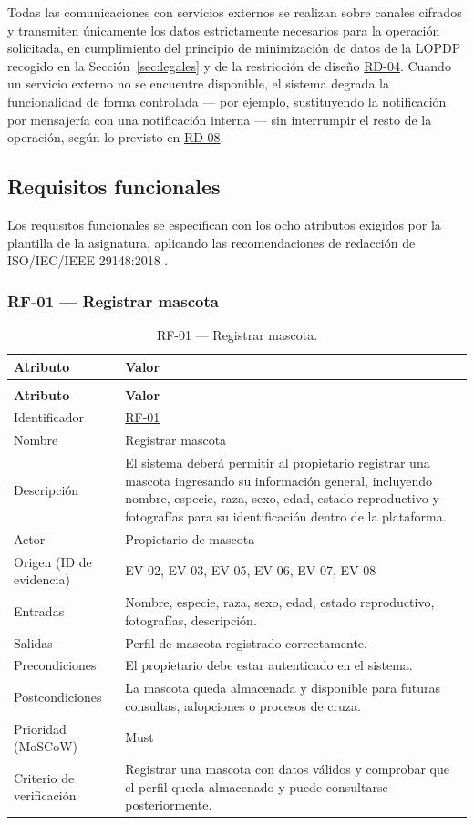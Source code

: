 \documentclass[journal,onecolumn]{IEEEtran}
\makeatletter
\newenvironment{atributos}[2]{%
	\small
	\begin{longtable}{@{}>{\raggedright\arraybackslash}p{4.2cm} >{\raggedright\arraybackslash}p{11.2cm}@{}}
		\caption{#2}\label{tab:#1}\\
		\toprule
		\textbf{Atributo} & \textbf{Valor} \\
		\midrule
		\endfirsthead
		\multicolumn{2}{@{}l}{\small\itshape (continuación)}\\
		\toprule
		\textbf{Atributo} & \textbf{Valor} \\
		\midrule
		\endhead
		\bottomrule
		\endlastfoot
	}{%
	\end{longtable}
	\normalsize
}
\makeatother
\begin{document}
	Todas las comunicaciones con servicios externos se realizan sobre canales
	cifrados y transmiten únicamente los datos estrictamente necesarios para la
	operación solicitada, en cumplimiento del principio de minimización de datos
	de la LOPDP recogido en la Sección~\ref{sec:legales} y de la restricción de
	diseño \hyperref[tab:RD-04]{RD-04}. Cuando un servicio externo no se encuentre disponible, el
	sistema degrada la funcionalidad de forma controlada --- por ejemplo,
	sustituyendo la notificación por mensajería con una notificación interna ---
	sin interrumpir el resto de la operación, según lo previsto en \hyperref[tab:RD-08]{RD-08}.
	
	\subsection{Requisitos funcionales}
	\label{sec:rf}
	
	Los requisitos funcionales se especifican con los ocho atributos exigidos por la
	plantilla de la asignatura, aplicando las recomendaciones de redacción de
	ISO/IEC/IEEE 29148:2018 \cite{iso29148}.
	
	\subsubsection{RF-01 --- Registrar mascota}
	
	\begin{atributos}{RF-01}{RF-01 --- Registrar mascota.}
		Identificador & \hyperref[tab:RF-01]{RF-01} \\
		Nombre & Registrar mascota \\
		Descripción & El sistema deberá permitir al propietario registrar una mascota ingresando su información general, incluyendo nombre, especie, raza, sexo, edad, estado reproductivo y fotografías para su identificación dentro de la plataforma. \\
		Actor & Propietario de mascota \\
		Origen (ID de evidencia) & EV-02, EV-03, EV-05, EV-06, EV-07, EV-08 \\
		Entradas & Nombre, especie, raza, sexo, edad, estado reproductivo, fotografías, descripción. \\
		Salidas & Perfil de mascota registrado correctamente. \\
		Precondiciones & El propietario debe estar autenticado en el sistema. \\
		Postcondiciones & La mascota queda almacenada y disponible para futuras consultas, adopciones o procesos de cruza. \\
		Prioridad (MoSCoW) & Must \\
		Criterio de verificación & Registrar una mascota con datos válidos y comprobar que el perfil queda almacenado y puede consultarse posteriormente. \\
	\end{atributos}
	
\end{document}
